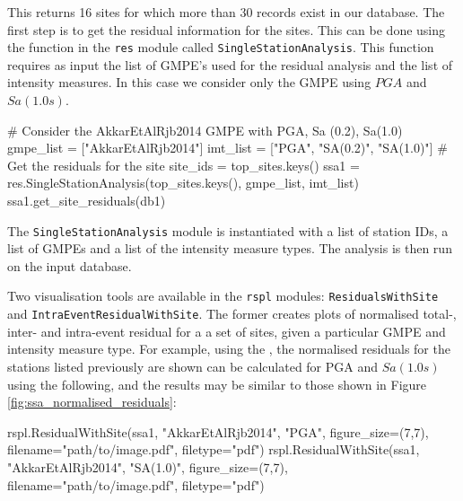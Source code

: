 This returns 16 sites for which more than 30 records exist in our database. The first step is to get the residual information for the sites. This can be done using the function in the \verb=res= module called \verb=SingleStationAnalysis=. This function requires as input the list of GMPE's used for the residual analysis and the list of intensity measures. In this case we consider only the \textcite{Akkar_etal2014} GMPE using $PGA$ and $Sa \left( {1.0 s} \right)$.

\begin{python}
# Consider the AkkarEtAlRjb2014 GMPE with PGA, Sa (0.2), Sa(1.0)
gmpe_list = ["AkkarEtAlRjb2014"]
imt_list = ["PGA", "SA(0.2)", "SA(1.0)"]
# Get the residuals for the site
site_ids = top_sites.keys()
ssa1 = res.SingleStationAnalysis(top_sites.keys(),
                                 gmpe_list,
                                 imt_list)
ssa1.get_site_residuals(db1)
\end{python}

The \verb=SingleStationAnalysis= module is instantiated with a list of station IDs, a list of GMPEs and a list of the intensity measure types. The analysis is then run on the input database.

Two visualisation tools are available in the \verb=rspl= modules: \verb=ResidualsWithSite= and \verb=IntraEventResidualWithSite=. The former creates plots of normalised total-, inter- and intra-event residual for a a set of sites, given a particular GMPE and intensity measure type. For example, using the \textcite{Akkar_etal2014}, the normalised residuals for the stations listed previously are shown can be calculated for PGA and $Sa \left( {1.0 s} \right)$ using the following, and the results may be similar to those shown in Figure \ref{fig:ssa_normalised_residuals}:

\begin{python}
rspl.ResidualWithSite(ssa1,
                      "AkkarEtAlRjb2014",
                      "PGA",
                      figure_size=(7,7),
                      filename="path/to/image.pdf",
                      filetype="pdf")
rspl.ResidualWithSite(ssa1,
                      "AkkarEtAlRjb2014",
                      "SA(1.0)",
                      figure_size=(7,7),
                      filename="path/to/image.pdf",
                      filetype="pdf")
\end{python}

